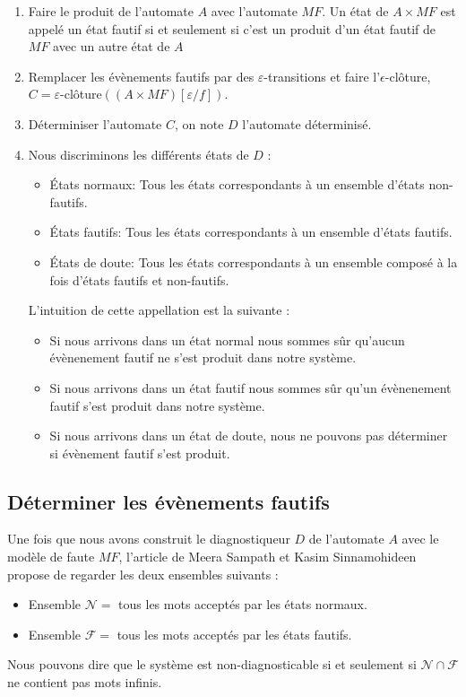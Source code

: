 \documentclass[10pt,a4paper]{article}
\begin{document}
    \begin{enumerate}
            \item Faire le  produit de l'automate $A$ avec l'automate $MF$. Un \'etat de $A\times MF$ est appel\'e un \'etat fautif si et seulement si c'est un produit d'un \'etat fautif de $MF$ avec un autre \'etat de $A$
            \item Remplacer les \'ev\`enements fautifs par des $\varepsilon$-transitions et faire l'$\epsilon$-cl\^oture, $C = \varepsilon$-clôture$((A\times MF)[\varepsilon/f])$.
          \item D\'eterminiser l'automate $C$, on note $D$ l'automate d\'eterminis\'e.
            \item Nous discriminons les diff\'erents \'etats de $D$ :
                    \begin{itemize}
                            \item  \'Etats normaux: Tous les \'etats correspondants à un ensemble d'\'etats non-fautifs.
                           \item \'Etats fautifs:  Tous les \'etats correspondants à un ensemble d'\'etats fautifs.
                            \item \'Etats de doute: Tous les \'etats correspondants à un ensemble composé à la fois d'\'etats fautifs et non-fautifs.
                    \end{itemize}  
                      L'intuition de cette appellation est la suivante : 
                    \begin{itemize}
                    \item Si nous arrivons dans un \'etat normal nous sommes s\^ur qu'aucun \'ev\`enenement fautif ne s'est produit dans notre syst\`eme. 
    \item Si nous arrivons dans un \'etat fautif nous sommes s\^ur qu'un \'ev\`enenement fautif s'est produit dans notre syst\`eme. 
            \item Si nous arrivons dans un \'etat de doute, nous ne pouvons pas d\'eterminer si \'ev\`enement fautif s'est produit.
\end{itemize}
    \end{enumerate} 
    \subsection{D\'eterminer les \'ev\`enements fautifs}
        Une fois que nous avons construit le diagnostiqueur $D$ de l'automate $A$ avec le mod\`ele de faute $MF$, l'article de Meera Sampath et Kasim Sinnamohideen propose de regarder les deux ensembles suivants :
        \begin{itemize}
             \item Ensemble $\mathcal{N} = $ tous les mots accept\'es par les \'etats normaux.  %
             \item Ensemble $\mathcal{F} = $ tous les mots accept\'es par les \'etats fautifs. %
        \end{itemize}
    Nous pouvons dire que le syst\`eme est non-diagnosticable si et seulement si $\mathcal{N}\cap \mathcal{F}$ ne contient pas  mots infinis.%
\end{document}
